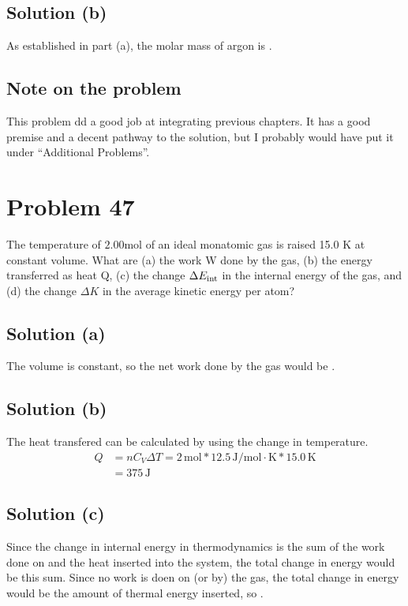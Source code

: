 \documentclass[12pt]{article}
\begin{document}
        \subsection{Solution (b)}
            As established in part (a), the molar mass of argon is \boxed{39.83\unit{\gram/\mole}}.

        \subsection{Note on the problem}
            This problem dd a good job at integrating previous chapters. 
            It has a good premise and a decent pathway to the solution, but I probably would have put it under ``Additional Problems''.

    \pagebreak
    \section{Problem 47}
        The temperature of $2.00 \unit{\mole}$ of an ideal monatomic gas is raised 15.0 K at constant volume. 
        What are (a) the work W done by the gas, (b) the energy transferred as heat Q, (c) the change $\Delta E_{\rm int}$ in the internal energy of the gas, and (d) the change $\Delta K$ in the average kinetic energy per atom?

        \subsection{Solution (a)}
            The volume is constant, so the net work done by the gas would be .

        \subsection{Solution (b)}
            The heat transfered can be calculated by using the change in temperature.
            \begin{align}
                Q   &=  n C_V \Delta T
                    =   2\,\unit{\mole} * 12.5\,\unit{\joule/\mole\cdot\kelvin} * 15.0\,\unit{\kelvin}\\
                    &=  \boxed{375\,\unit{\joule}}
            \end{align}

        \subsection{Solution (c)}
            Since the change in internal energy in thermodynamics is the sum of the work done on and the heat inserted into the system, the total change in energy would be this sum.
            Since no work is doen on (or by) the gas, the total change in energy would be the amount of thermal energy inserted, so .
\end{document}
